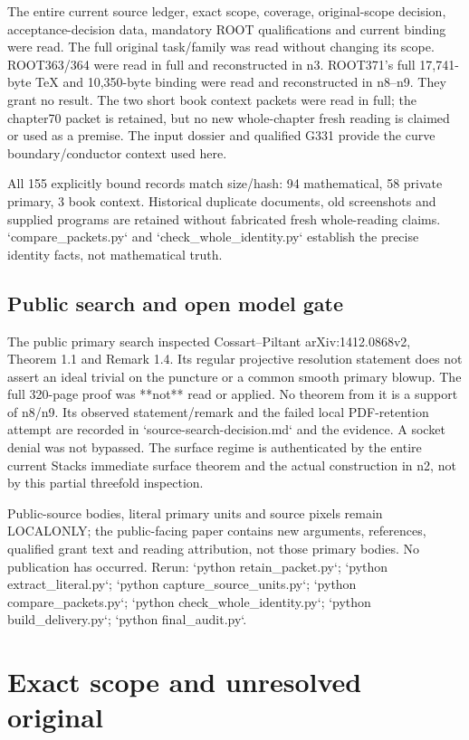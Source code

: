 \documentclass[11pt]{article}
\begin{document}
The entire current source ledger, exact scope, coverage, original-scope decision, acceptance-decision data, mandatory ROOT qualifications and current binding were read. The full original task/family was read without changing its scope. ROOT363/364 were read in full and reconstructed in n3. ROOT371's full 17,741-byte TeX and 10,350-byte binding were read and reconstructed in n8--n9. They grant no result. The two short book context packets were read in full; the chapter70 packet is retained, but no new whole-chapter fresh reading is claimed or used as a premise. The input dossier and qualified G331 provide the curve boundary/conductor context used here.

All 155 explicitly bound records match size/hash: 94 mathematical, 58 private primary, 3 book context. Historical duplicate documents, old screenshots and supplied programs are retained without fabricated fresh whole-reading claims. `compare\_packets.py` and `check\_whole\_identity.py` establish the precise identity facts, not mathematical truth.

\subsection{Public search and open model gate}

The public primary search inspected Cossart--Piltant arXiv:1412.0868v2, Theorem 1.1 and Remark 1.4. Its regular projective resolution statement does not assert an ideal trivial on the puncture or a common smooth primary blowup. The full 320-page proof was **not** read or applied. No theorem from it is a support of n8/n9. Its observed statement/remark and the failed local PDF-retention attempt are recorded in `source-search-decision.md` and the evidence. A socket denial was not bypassed. The surface regime is authenticated by the entire current Stacks immediate surface theorem and the actual construction in n2, not by this partial threefold inspection.

Public-source bodies, literal primary units and source pixels remain LOCALONLY; the public-facing paper contains new arguments, references, qualified grant text and reading attribution, not those primary bodies. No publication has occurred. Rerun: `python retain\_packet.py`; `python extract\_literal.py`; `python capture\_source\_units.py`; `python compare\_packets.py`; `python check\_whole\_identity.py`; `python build\_delivery.py`; `python final\_audit.py`. 

\section{Exact scope and unresolved original}
\end{document}
